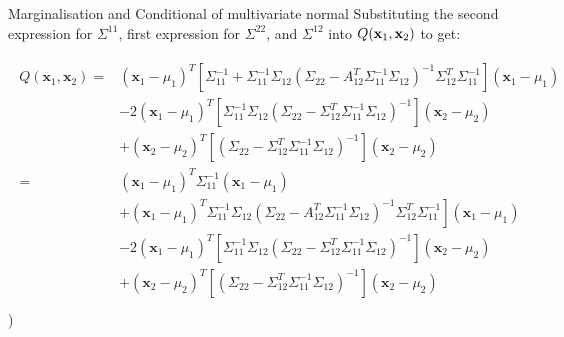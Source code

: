 \documentclass{beamer}
\begin{document}
\begin{frame}{Marginalisation and Conditional of multivariate normal}
	Substituting the second expression for $\Sigma^{11}$, first expression for $\Sigma^{22}$, and $\Sigma^{12}$ into $Q({\bf x}_1,{\bf x}_2)$ to get:
	
	\begin{gather}
	\begin{aligned}
	Q\left(\mathbf{x}_{1}, \mathbf{x}_{2}\right)=&\left(\mathbf{x}_{1}-\mu_{1}\right)^{T}\left[\Sigma_{11}^{-1}+\Sigma_{11}^{-1} \Sigma_{12}\left(\Sigma_{22}-A_{12}^{T} \Sigma_{11}^{-1} \Sigma_{12}\right)^{-1} \Sigma_{12}^{T} \Sigma_{11}^{-1}\right]\left(\mathbf{x}_{1}-\mu_{1}\right) \\
	&-2\left(\mathbf{x}_{1}-\mu_{1}\right)^{T}\left[\Sigma_{11}^{-1} \Sigma_{12}\left(\Sigma_{22}-\Sigma_{12}^{T} \Sigma_{11}^{-1} \Sigma_{12}\right)^{-1}\right]\left(\mathbf{x}_{2}-\mu_{2}\right) \\
	&+\left(\mathbf{x}_{2}-\mu_{2}\right)^{T}\left[\left(\Sigma_{22}-\Sigma_{12}^{T} \Sigma_{11}^{-1} \Sigma_{12}\right)^{-1}\right]\left(\mathbf{x}_{2}-\mu_{2}\right)\\
	=&\left(\mathbf{x}_{1}-\mu_{1}\right)^{T} \Sigma_{11}^{-1}\left(\mathbf{x}_{1}-\mu_{1}\right) \\
	&\left.+\left(\mathbf{x}_{1}-\mu_{1}\right)^{T} \Sigma_{11}^{-1} \Sigma_{12}\left(\Sigma_{22}-A_{12}^{T} \Sigma_{11}^{-1} \Sigma_{12}\right)^{-1} \Sigma_{12}^{T} \Sigma_{11}^{-1}\right]\left(\mathbf{x}_{1}-\mu_{1}\right) \\
	&-2\left(\mathbf{x}_{1}-\mu_{1}\right)^{T}\left[\Sigma_{11}^{-1} \Sigma_{12}\left(\Sigma_{22}-\Sigma_{12}^{T} \Sigma_{11}^{-1} \Sigma_{12}\right)^{-1}\right]\left(\mathbf{x}_{2}-\mu_{2}\right) \\
	&+\left(\mathbf{x}_{2}-\mu_{2}\right)^{T}\left[\left(\Sigma_{22}-\Sigma_{12}^{T} \Sigma_{11}^{-1} \Sigma_{12}\right)^{-1}\right]\left(\mathbf{x}_{2}-\mu_{2}\right)
	\end{aligned}\\
	\end{gather})
\end{frame}
\end{document}
